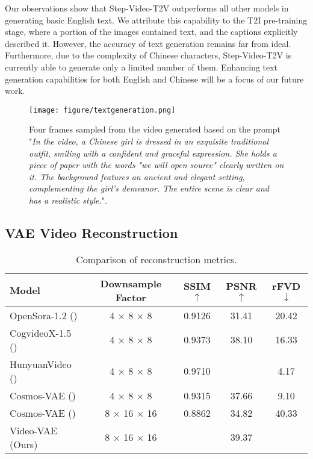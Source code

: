 Our observations show that Step-Video-T2V outperforms all other models in generating basic English text. We attribute this capability to the T2I pre-training stage, where a portion of the images contained text, and the captions explicitly described it. However, the accuracy of text generation remains far from ideal. Furthermore, due to the complexity of Chinese characters, Step-Video-T2V is currently able to generate only a limited number of them. Enhancing text generation capabilities for both English and Chinese will be a focus of our future work.

\begin{figure}[ht]
    \centering
    \texttt{[image: figure/textgeneration.png]}
    \caption{Four frames sampled from the video generated based on the prompt "\textit{In the video, a Chinese girl is dressed in an exquisite traditional outfit, smiling with a confident and graceful expression. She holds a piece of paper with the words "we will open source" clearly written on it. The background features an ancient and elegant setting, complementing the girl's demeanor. The entire scene is clear and has a realistic style.}".}
    \label{fig:text}
\end{figure}

\subsection{VAE Video Reconstruction}

\begin{table}[h]\scriptsize
    \centering
    \begin{tabular}{lcccc}
    \toprule
    \textbf{Model} & \textbf{Downsample Factor} & \textbf{SSIM$\uparrow$} & \textbf{PSNR$\uparrow$} & \textbf{rFVD$\downarrow$} \\
    \midrule
    OpenSora-1.2 (\cite{opensora}) & 4 × 8 × 8 & 0.9126 & 31.41 & 20.42 \\
    CogvideoX-1.5 (\cite{yang2024cogvideox}) & 4 × 8 × 8 & 0.9373 & 38.10 & 16.33 \\
    HunyuanVideo (\cite{kong2024hunyuanvideo}) & 4 × 8 × 8 & 0.9710 & \cellcolor{green!20}{39.56} & 4.17 \\
    Cosmos-VAE (\cite{agarwal2025cosmos}) & 4 × 8 × 8 & 0.9315 & 37.66 & 9.10 \\
    \hline
    Cosmos-VAE (\cite{agarwal2025cosmos}) & 8 × 16 × 16 & 0.8862 & 34.82 & 40.33 \\
    \hline
    Video-VAE (Ours) & 8 × 16 × 16 & \cellcolor{green!20}{0.9776} & 39.37 & \cellcolor{green!20}{3.61} \\
    \bottomrule
    \end{tabular}
    \caption{Comparison of reconstruction metrics.}
    \label{tab: vae}
\end{table}

